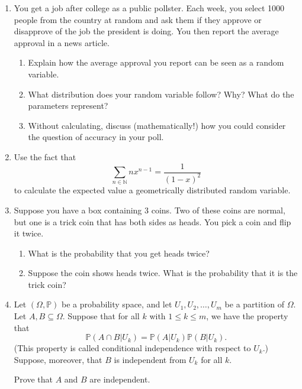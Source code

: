 \documentclass[12pt]{article}
\newcommand{\N}{\mathbb{N}}
\renewcommand{\P}{\mathbb{P}}
\newcommand{\p}[1]{\P\left(#1\right)}
\begin{document}
\begin{enumerate}
\item You get a job after college as a public pollster. Each week, you select 1000 people from the country at random and ask them if they approve or disapprove of the job the president is doing. You then report the average approval in a news article.
\begin{enumerate}
\item Explain how the average approval you report can be seen as a random variable.
\item What distribution does your random variable follow? Why? What do the parameters represent?
\item Without calculating, discuss (mathematically!) how you could consider the question of accuracy in your poll.
\end{enumerate}

\item Use the fact that 
\[\sum_{n\in\N} nx^{n-1} = \frac{1}{(1-x)^2}\]
to calculate the expected value a geometrically distributed random variable.

\item Suppose you have a box containing 3 coins. Two of these coins are normal, but one is a trick coin that has both sides as heads. You pick a coin and flip it twice.
\begin{enumerate}
\item What is the probability that you get heads twice?
\item Suppose the coin shows heads twice. What is the probability that it is the trick coin?
\end{enumerate}

\item Let $(\Omega, \P)$ be a probability space, and let $U_1, U_2, \dots, U_m$ be a partition of $\Omega$. Let $A, B\subseteq \Omega$. Suppose that for all $k$ with $1\leq k\leq m$, we have the property that
\[\p{A\cap B\vert U_k} = \p{A\vert U_k}\p{B\vert U_k}.\]
(This property is called conditional independence with respect to $U_k$.) Suppose, moreover, that $B$ is independent from $U_k$ for all $k$.

Prove that $A$ and $B$ are independent.
\end{enumerate}
\end{document}
